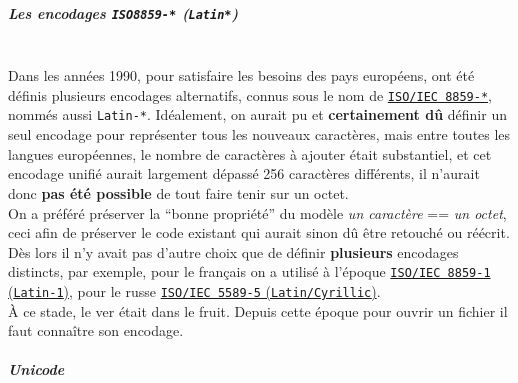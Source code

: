     \hypertarget{les-encodages-iso8859--latin}{%
\subparagraph{\texorpdfstring{Les encodages \texttt{ISO8859-*}
(\texttt{Latin*})}{Les encodages ISO8859-* (Latin*)}\\\\}\label{les-encodages-iso8859--latin}}

    Dans les années 1990, pour satisfaire les besoins des pays européens,
ont été définis plusieurs encodages alternatifs, connus sous le nom de
\href{http://en.wikipedia.org/wiki/ISO/IEC_8859}{\texttt{ISO/IEC\ 8859-*}},
nommés aussi \texttt{Latin-*}. Idéalement, on aurait pu et
\textbf{certainement dû} définir un seul encodage pour représenter tous
les nouveaux caractères, mais entre toutes les langues européennes, le
nombre de caractères à ajouter était substantiel, et cet encodage unifié
aurait largement dépassé 256 caractères différents, il n'aurait donc
\textbf{pas été possible} de tout faire tenir sur un octet.\\

On a préféré préserver la ``bonne propriété'' du modèle \emph{un
caractère} == \emph{un octet}, ceci afin de préserver le code existant
qui aurait sinon dû être retouché ou réécrit.\\

Dès lors il n'y avait pas d'autre choix que de définir
\textbf{plusieurs} encodages distincts, par exemple, pour le français on
a utilisé à l'époque
\href{http://en.wikipedia.org/wiki/ISO/IEC_8859-1}{\texttt{ISO/IEC\ 8859-1}
(\texttt{Latin-1})}, pour le russe
\href{http://en.wikipedia.org/wiki/ISO/IEC_8859-5}{\texttt{ISO/IEC\ 5589-5}
(\texttt{Latin/Cyrillic})}.\\

À ce stade, le ver était dans le fruit. Depuis cette époque pour ouvrir
un fichier il faut connaître son encodage.

    \hypertarget{unicode}{%
\subparagraph{Unicode\\\\}\label{unicode}}

